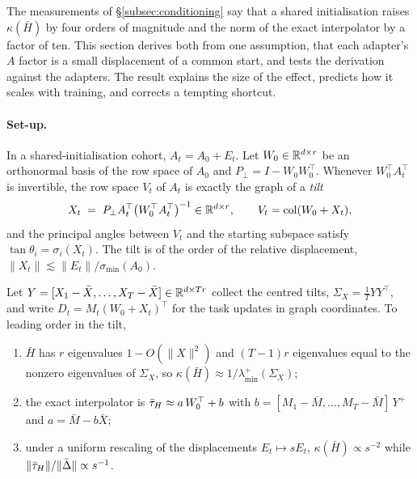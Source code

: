 
The measurements of \S\ref{subsec:conditioning} say that a shared
initialisation raises $\kappa(\bar H)$ by four orders of magnitude and the
norm of the exact interpolator by a factor of ten. This section derives both
from one assumption, that each adapter's $A$ factor is a small displacement of
a common start, and tests the derivation against the adapters. The result
explains the size of the effect, predicts how it scales with training, and
corrects a tempting shortcut.

\paragraph{Set-up.} In a shared-initialisation cohort, $A_t = A_0 + E_t$. Let
$W_0 \in \mathbb{R}^{d\times r}$ be an orthonormal basis of the row space of $A_0$ and
$P_\perp = I - W_0 W_0^\top$. Whenever $W_0^\top A_t^\top$ is invertible, the
row space $V_t$ of $A_t$ is exactly the graph of a \emph{tilt}
\begin{equation}\label{eq:tilt}
  X_t \;=\; P_\perp A_t^\top \bigl(W_0^\top A_t^\top\bigr)^{-1} \in \mathbb{R}^{d\times r},
  \qquad V_t = \operatorname{col}(W_0 + X_t),
\end{equation}
and the principal angles between $V_t$ and the starting subspace satisfy
$\tan\theta_i = \sigma_i(X_t)$. The tilt is of the order of the relative
displacement, $\|X_t\| \lesssim \|E_t\|/\sigma_{\min}(A_0)$.

\begin{proposition}
\label{prop:drift}
Let $Y = [X_1 - \bar X, \dots, X_T - \bar X] \in \mathbb{R}^{d\times Tr}$ collect the
centred tilts, $\Sigma_X = \tfrac1T Y Y^\top$, and write
$D_t = M_t (W_0 + X_t)^\top$ for the task updates in graph coordinates. To
leading order in the tilt,
\begin{enumerate}[leftmargin=*,itemsep=1pt,topsep=2pt]
\item $\bar H$ has $r$ eigenvalues $1 - O(\|X\|^2)$ and $(T-1)r$ eigenvalues
  equal to the nonzero eigenvalues of $\Sigma_X$, so
  $\kappa(\bar H) \approx 1/\lambda_{\min}^{+}(\Sigma_X)$;
\item the exact interpolator is $\bar{\tau}_H \approx a\,W_0^\top + b$ with
  $b = [M_1 - \bar M, \dots, M_T - \bar M]\, Y^{+}$ and $a = \bar M - b\bar X$;
\item under a uniform rescaling of the displacements $E_t \mapsto sE_t$,
  $\kappa(\bar H) \propto s^{-2}$ while
  $\|\bar{\tau}_H\|/\|\bar\Delta\| \propto s^{-1}$.
\end{enumerate}
\end{proposition}

